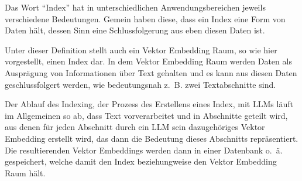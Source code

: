 \documentclass[../main.tex]{subfiles}
\begin{document}
Das Wort \enquote{Index} hat in unterschiedlichen Anwendungsbereichen jeweils verschiedene Bedeutungen.
Gemein haben diese, dass ein Index eine Form von Daten hält, dessen Sinn eine Schlussfolgerung aus eben diesen Daten ist.
\cite{Chatterjee2017Index,Lo2016What,Vickery1950THE}

Unter dieser Definition stellt auch ein Vektor Embedding Raum, so wie hier vorgestellt, einen Index dar.
In dem Vektor Embedding Raum werden Daten als Ausprägung von Informationen über Text gehalten und es kann aus diesen Daten geschlussfolgert werden, wie bedeutungsnah z. B. zwei Textabschnitte sind.

Der Ablauf des Indexing, der Prozess des Erstellens eines Index, mit \glspl{LLM} läuft im Allgemeinen so ab, dass Text vorverarbeitet und in Abschnitte geteilt wird, aus denen für jeden Abschnitt durch ein \gls{LLM} sein  dazugehöriges Vektor Embedding erstellt wird, das dann die Bedeutung dieses Abschnitts repräsentiert.
Die resultierenden Vektor Embeddings werden dann in einer Datenbank o. ä. gespeichert, welche damit den Index beziehungweise den Vektor Embedding Raum hält.
\cite{ji2022speeding}
\end{document}
